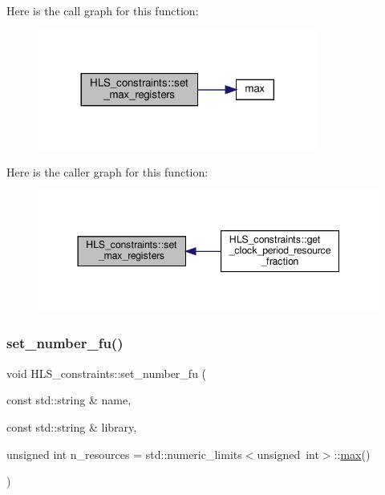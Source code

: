Here is the call graph for this function\+:
\nopagebreak
\begin{figure}[H]
\begin{center}
\leavevmode
\includegraphics[width=260pt]{dd/d96/classHLS__constraints_ab2df34ff3335a38b047895ca9d303583_cgraph}
\end{center}
\end{figure}
Here is the caller graph for this function\+:
\nopagebreak
\begin{figure}[H]
\begin{center}
\leavevmode
\includegraphics[width=344pt]{dd/d96/classHLS__constraints_ab2df34ff3335a38b047895ca9d303583_icgraph}
\end{center}
\end{figure}
\mbox{\label{classHLS__constraints_afc848917bd7caf8c0187ccefdf14e3de}} 
\subsubsection{\texorpdfstring{set\+\_\+number\+\_\+fu()}{set\_number\_fu()}}
{\footnotesize\ttfamily void H\+L\+S\+\_\+constraints\+::set\+\_\+number\+\_\+fu (\begin{DoxyParamCaption}\item[{const std\+::string \&}]{name,  }\item[{const std\+::string \&}]{library,  }\item[{unsigned int}]{n\+\_\+resources = {\ttfamily std\+:\+:numeric\+\_\+limits$<$unsigned~int$>$\+:\+:\hyperlink{tutorial__pact__2019_2Target-Customization_2first_2hint_8c_a28f422940797ea297699ba55d89171c5}{max}()} }\end{DoxyParamCaption})}



